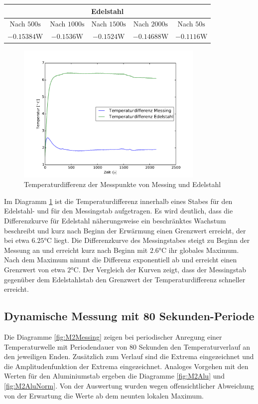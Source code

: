 \begin{table}[h!]
\centering
\begin{tabular}{ccccc}
	\multicolumn{5}{c}{Edelstahl}\\
	\toprule
	Nach $500\si{\second}$&Nach $1000\si{\second}$& Nach $1500\si{\second}$&Nach $2000\si{\second}$& Nach $50\si{\second}$\\
	$-0.15384\si{\watt}$&$-0.1536\si{\watt}$&$-0.1524\si{\watt}$&$-0.14688\si{\watt}$&$-0.1116\si{\watt}$\\
	\bottomrule
\end{tabular}
\end{table}
\begin{figure}[htp]
	\label{fig:tempverl}
	\centering
	\includegraphics[width=0.8\textwidth]{Bilder/M1_Tempdiff.pdf}
	\caption{Temperaturdifferenz der Messpunkte von Messing und Edelstahl}
\end{figure}
Im Diagramm \ref{fig:tempverl} ist die Temperaturdifferenz innerhalb eines Stabes für den Edelstahl- und für den Messingstab aufgetragen. 
Es wird deutlich, dass die Differenzkurve für Edelstahl näherungsweise ein beschränktes Wachstum beschreibt und kurz nach Beginn der Erwärmung einen Grenzwert erreicht, der bei etwa  $6.25 \si{\degreeCelsius}$ liegt.
Die Differenzkurve des Messingstabes steigt zu Beginn der Messung an und erreicht kurz nach Beginn mit $2.6 \si{\degreeCelsius}$ ihr globales Maximum. 
Nach dem Maximum nimmt die Differenz exponentiell ab und erreicht einen Grenzwert von etwa $2 \si{\degreeCelsius}$.
Der Vergleich der Kurven zeigt, dass der Messingstab gegenüber dem Edelstahlstab den Grenzwert der Temperaturdifferenz schneller erreicht.

\subsection{Dynamische Messung mit 80 Sekunden-Periode}
Die Diagramme \ref{fig:M2Messing} zeigen bei periodischer Anregung einer Temperaturwelle mit Periodendauer von 80 Sekunden den Temperaturverlauf an den jeweiligen Enden. 
Zusätzlich zum Verlauf sind die Extrema eingezeichnet und die Amplitudenfunktion der Extrema eingezeichnet. 
Analoges Vorgehen mit den Werten für den Aluminiumstab ergeben die Diagramme \ref{fig:M2Alu} und \ref{fig:M2AluNorm}.
Von der Auswertung wurden wegen offensichtlicher Abweichung von der Erwartung die Werte ab dem neunten lokalen Maximum. 

